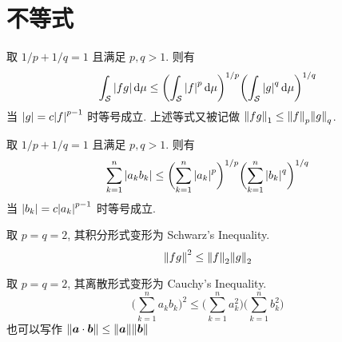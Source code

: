 \section{不等式}
\begin{defination}
取 $1/p + 1/q = 1$ 且满足 $p, q > 1$. 则有
\[
\int_\mathcal{S} {\lvert {f g} \rvert} \operatorname{d\!} \mu
    \leq \biggl( \int_\mathcal{S} {\lvert {f} \rvert}^p \operatorname{d\!} \mu \biggr)^{1/p}
        \biggl( \int_\mathcal{S} {\lvert {g} \rvert}^q \operatorname{d\!} \mu \biggr)^{1/q}
\]
当 ${\lvert {g} \rvert} = c {\lvert {f} \rvert}^{p-1}$ 时等号成立. 上述等式又被记做
${{\| {fg} \|}}_{1} \leq {{\| {f} \|}}_{p} {{\| {g} \|}}_{q}$.
\end{defination}

\begin{defination}
取 $1/p + 1/q = 1$ 且满足 $p, q > 1$. 则有
\[
\sum_{k=1}^n {\lvert {a_k b_k} \rvert}
    \leq \biggl( \sum_{k=1}^n {\lvert {a_k} \rvert}^p \biggr)^{1/p}
        \biggl( \sum_{k=1}^n {\lvert {b_k} \rvert}^q \biggr)^{1/q}
\]
当 ${\lvert {b_k} \rvert} = c {\lvert {a_k} \rvert}^{p-1}$ 时等号成立.
\end{defination}

\begin{thm}
取 $p = q = 2$, 其积分形式变形为 Schwarz's Inequality.
\[ {\| {fg} \|}^2 \leq {{\| {f} \|}}_{2} {{\| {g} \|}}_{2} \]
\end{thm}

\begin{thm}
取 $p = q = 2$, 其离散形式变形为 Cauchy's Inequality.
\[
\biggl(\sum_{k=1}^n a_k b_k \biggr)^2
    \leq \biggl(\sum_{k=1}^n a_k^2 \biggr) \biggl(\sum_{k=1}^n b_k^2 \biggr)\]
也可以写作 ${\| {{\bm a}\cdot{\bm b}} \|} \leq {\| {{\bm a}} \|} {\| {{\bm b}} \|}$
\end{thm}
\endinput
